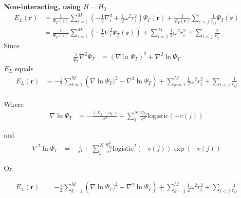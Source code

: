 \documentclass[%
oneside,                 %
final,                   %
10pt]{article}
\begin{document}
\textbf{Non-interacting, using $H=H_0$}
\begin{equation}
\begin{aligned}
E_L(\mathbf{r})&=\frac{1}{\Psi_T(\mathbf{r})}   \sum_{i=1}^{M} \left(  -\frac{1}{2} \nabla_i^2 + \frac{1}{2} \omega^2r_i^2  \right) \Psi_T(\mathbf{r}) + \frac{1}{\Psi_T(\mathbf{r})}  \sum_{i<j}\frac{1}{r_{ij}}  \Psi_T(\mathbf{r}) \\
&=\frac{1}{\Psi_T(\mathbf{r})}   \sum_{i=1}^{M} \left(  -\frac{1}{2} \nabla_i^2 \Psi_T(\mathbf{r})\right) + \sum_{i=1}^{M} \frac{1}{2} \omega^2r_i^2    +  \sum_{i<j}\frac{1}{r_{ij}}  
\end{aligned}
\label{eq:Appendix_rewrite}
\end{equation}
Since
\begin{equation}
\begin{aligned}
\frac{1}{\Psi_T}\nabla^2 \Psi_T & = (\nabla \ln \Psi_T)^2 + \nabla^2 \ln \Psi_T
\end{aligned}
\label{eq:Appendix_rewrite}
\end{equation}
$E_L$ equals
\begin{equation}
\begin{aligned}
E_L(\mathbf{r})
&= -\frac{1}{2}  \sum_{k=1}^{M} \left( \nabla \ln \Psi_T)^2 + \nabla^2 \ln \Psi_T \right) + \sum_{k=1}^{M} \frac{1}{2} \omega^2r_i^2    +  \sum_{i<j}\frac{1}{r_{ij}}  \\
\end{aligned}
\label{eq:Appendix_rewrite}
\end{equation}

Where
\begin{equation}
\begin{aligned}
\nabla \ln \Psi_T
&= - \frac{(X_k - a_k)}{\sigma^2} + \sum_{j}^N \frac{w_{kj}}{\sigma^2} \text {logistic} ( -v(j) ) 
\end{aligned}
\label{eq:Appendix_1derivative}
\end{equation}

and
\begin{equation}
\begin{aligned}
\nabla^2 \ln \Psi_T
  &=
 - \frac{1}{\sigma^2} + \sum_{j}^N \frac{w_{kj}^2}{\sigma^4}  \text {logistic}^2 ( -v(j) ) \exp(-v(j))
\end{aligned}
\label{eq:Appendix_2derivative}
\end{equation}


Or:

\begin{equation}
\begin{aligned}
E_L(\mathbf{r})
&= -\frac{1}{2}  \sum_{k=1}^{M} \left( \nabla \ln \Psi_T)^2 + \nabla^2 \ln \Psi_T \right) + \sum_{k=1}^{M} \frac{1}{2} \omega^2r_i^2    +  \sum_{i<j}\frac{1}{r_{ij}}  \\
\end{aligned}
\label{eq:Appendix_rewrite}
\end{equation}
\end{document}
